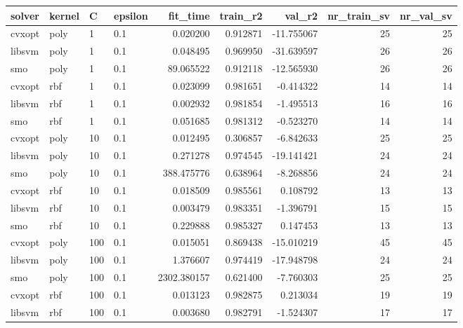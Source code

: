 \begin{tabular}{llllrrrrr}
\toprule
solver & kernel &   C & epsilon &    fit\_time &  train\_r2 &      val\_r2 &  nr\_train\_sv &  nr\_val\_sv \\
\midrule
cvxopt &   poly &   1 &     0.1 &    0.020200 &  0.912871 &  -11.755067 &           25 &         25 \\
libsvm &   poly &   1 &     0.1 &    0.048495 &  0.969950 &  -31.639597 &           26 &         26 \\
   smo &   poly &   1 &     0.1 &   89.065522 &  0.912118 &  -12.565930 &           26 &         26 \\
cvxopt &    rbf &   1 &     0.1 &    0.023099 &  0.981651 &   -0.414322 &           14 &         14 \\
libsvm &    rbf &   1 &     0.1 &    0.002932 &  0.981854 &   -1.495513 &           16 &         16 \\
   smo &    rbf &   1 &     0.1 &    0.051685 &  0.981312 &   -0.523270 &           14 &         14 \\
cvxopt &   poly &  10 &     0.1 &    0.012495 &  0.306857 &   -6.842633 &           25 &         25 \\
libsvm &   poly &  10 &     0.1 &    0.271278 &  0.974545 &  -19.141421 &           24 &         24 \\
   smo &   poly &  10 &     0.1 &  388.475776 &  0.638964 &   -8.268856 &           24 &         24 \\
cvxopt &    rbf &  10 &     0.1 &    0.018509 &  0.985561 &    0.108792 &           13 &         13 \\
libsvm &    rbf &  10 &     0.1 &    0.003479 &  0.983351 &   -1.396791 &           15 &         15 \\
   smo &    rbf &  10 &     0.1 &    0.229888 &  0.985327 &    0.147453 &           13 &         13 \\
cvxopt &   poly & 100 &     0.1 &    0.015051 &  0.869438 &  -15.010219 &           45 &         45 \\
libsvm &   poly & 100 &     0.1 &    1.376607 &  0.974419 &  -17.948798 &           24 &         24 \\
   smo &   poly & 100 &     0.1 & 2302.380157 &  0.621400 &   -7.760303 &           25 &         25 \\
cvxopt &    rbf & 100 &     0.1 &    0.013123 &  0.982875 &    0.213034 &           19 &         19 \\
libsvm &    rbf & 100 &     0.1 &    0.003680 &  0.982791 &   -1.524307 &           17 &         17 \\

\end{tabular}
